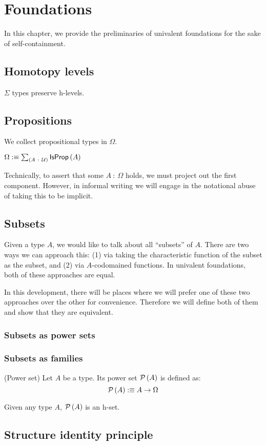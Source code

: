 \chapter{Foundations}

In this chapter, we provide the preliminaries of univalent foundations for the sake of
self-containment.

\section{Homotopy levels}

\begin{prop}\label{isOfHLevelSigma}
  $\Sigma$ types preserve h-levels.
\end{prop}

\section{Propositions}

We collect propositional types in $\Omega$.

\begin{defn}\label{omega}
  $\Omega :\equiv \sum_{(A~:~\mathcal{U})} \mathsf{IsProp}\left(A\right)$
\end{defn}

Technically, to assert that some $A~:~\Omega$ holds, we must project out the first component.
However, in informal writing we will engage in the notational abuse of taking this to be
implicit.

\section{Subsets}

Given a type $A$, we would like to talk about all ``subsets'' of $A$. There are
two ways we can approach this: (1) via taking the characteristic function of the
subset as the subset, and (2) via $A$-codomained functions. In univalent
foundations, both of these approaches are equal.

In this development, there will be places where we will prefer one of these two
approaches over the other for convenience. Therefore we will define both of them
and show that they are equivalent.

\subsection{Subsets as power sets}

\subsection{Subsets as families}

\begin{defn}(Power set)
  Let $A$ be a type. Its power set $\mathcal{P}\left(A\right)$ is defined as:
  \begin{equation*}
    \mathcal{P}\left(A\right) :\equiv A \rightarrow \Omega
  \end{equation*}
\end{defn}

\begin{prop}\label{isSetPow}
  Given any type $A$, $\mathcal{P}\left(A\right)$ is an h-set.
\end{prop}

\section{Structure identity principle}
